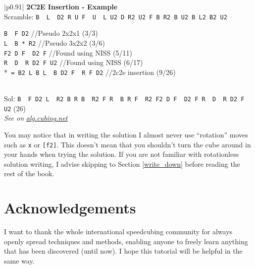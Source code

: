 \documentclass[11pt,a4paper]{book}
\newcommand{\p}{\textquotesingle}
\newcommand{\m}{\texttt}
\newcommand{\ps}{\p\,\,}
\newcommand{\comment}[1]{{\color{gray}\quad//#1}}
\begin{document}
\bigskip
\begin{tabular}{|p{}|}
\hline
\textbf{2C2E Insertion - Example}\\
\hline
Scramble: \m{B\ps L\ps D2 R U F\ps U\ps L U2 D R2 U2 F B R2 B U2 B L2 B2 U2}\\
\hline
\begin{minipage}[l]{0.650\textwidth}
\m{B\ps F D2} \comment{Pseudo 2x2x1 (3/3)}\\
\m{L\ps B * R2} \comment{Pseudo 3x2x2 (3/6)}\\
\m{F2 D F\ps D2 F} \comment{Found using NISS (5/11)}\\
\m{R\ps D\ps R D2 F U2} \comment{Found using NISS (6/17)}\\
*\m{ = B2 L B L\ps B D2 F\ps R F D2} \comment{2c2e insertion (9/26)}
\end{minipage}
\begin{minipage}[c]{0.25\textwidth}

\end{minipage}\\
\hline
Sol: \m{B\ps F D2 L\ps R2 B R B\ps R2 F R\ps B R F\ps R2 F2 D F\ps D2 F R\ps D\ps R D2 F U2} (26)\\
\hline
\emph{See on }\href{https://alg.cubing.net/?setup=B-_L-_D2_R_U_F-_U-_L_U2_D_R2_U2_F_B_R2_B_U2_B_L2_B2_U2&alg=B-_F_D2_\%2F\%2FPseudo_2x2x1_(3\%2F3)\%0AL-_B_(B2_L_B_L-_B_D2_F-_R_F_D2)_R2_\%2F\%2FPseudo_3x2x2_(3\%2F6)\%0AF2_D_F-_D2_F_\%2F\%2FFound_using_NISS_(5\%2F11)\%0AR-_D-_R_D2_F_U2_\%2F\%2FFound_using_NISS_(6\%2F17)}{\emph{alg.cubing.net}}\\
\hline
\end{tabular}
\bigskip

You may notice that in writing the solution I almost never use ``rotation'' moves such as \m x or \m{[f2]}. This doesn't mean that you shouldn't turn the cube around in your hands when trying the solution. If you are not familiar with rotationless solution writing, I advise skipping to Section \ref{write_down} before reading the rest of the book.

\section*{Acknowledgements}

I want to thank the whole international speedcubing community for always openly spread techniques and methods, enabling anyone to freely learn anything that has been discovered (until now). I hope this tutorial will be helpful in the same way.
\end{document}
